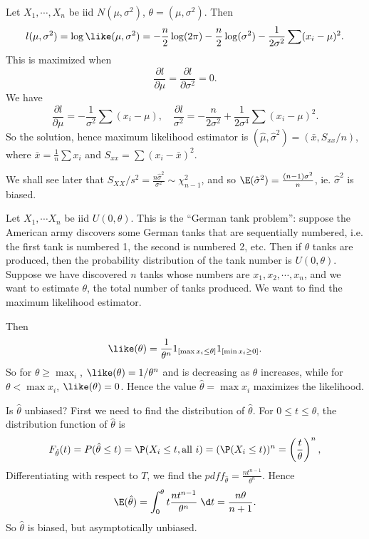 \documentclass[a4paper]{article}
\begin{document}
\begin{eg}
  Let $X_1, \cdots, X_n$ be iid $N(\mu, \sigma^2)$, $\theta = (\mu, \sigma^2)$. Then
  \[
    l(\mu, \sigma^2) = \log\like(\mu, \sigma^2) = -\frac{n}{2}\log (2\pi) - \frac{n}{2}\log (\sigma^2) - \frac{1}{2\sigma^2}\sum (x_i - \mu)^2.
  \]
  This is maximized when
  \[
    \frac{\partial l}{\partial\mu} = \frac{\partial l}{\partial \sigma^2} = 0.
  \]
  We have
  \[
    \frac{\partial l}{\partial \mu} = -\frac{1}{\sigma^2}\sum (x_i - \mu), \quad \frac{\partial l}{\sigma^2} = -\frac{n}{2\sigma^2} + \frac{1}{2\sigma^4}\sum (x_i - \mu)^2.
  \]
  So the solution, hence maximum likelihood estimator is $(\hat{\mu}, \hat{\sigma}^2) = (\bar x, S_{xx}/n)$, where $\bar{x} = \frac{1}{n}\sum x_i$ and $S_{xx} = \sum(x_i - \bar{x})^2$.

  We shall see later that $S_{XX}/s^2 = \frac{n\hat{\sigma}^2}{\sigma^2}\sim \chi_{n - 1}^2$, and so $\E(\hat{\sigma}^2) = \frac{(n - 1)\sigma^2}{n}$, ie. $\hat{\sigma}^2$ is biased.
\end{eg}

\begin{eg}
  Let $X_1, \cdots X_n$ be iid $U(0, \theta)$. This is the ``German tank problem'': suppose the American army discovers some German tanks that are sequentially numbered, i.e. the first tank is numbered 1, the second is numbered 2, etc. Then if $\theta$ tanks are produced, then the probability distribution of the tank number is $U(0, \theta)$. Suppose we have discovered $n$ tanks whose numbers are $x_1, x_2, \cdots, x_n$, and we want to estimate $\theta$, the total number of tanks produced. We want to find the maximum likelihood estimator.

  Then
  \[
    \like(\theta) = \frac{1}{\theta^n}1_{[\max x_i \leq \theta]}1_{[\min x_i\geq 0]}.
  \]
  So for $\theta\geq \max _i$, $\like (\theta) = 1/\theta^n$ and is decreasing as $\theta$ increases, while for $\theta < \max x_i$, $\like (\theta) = 0$. Hence the value $\hat{\theta} = \max x_i$ maximizes the likelihood.

  Is $\hat{\theta}$ unbiased? First we need to find the distribution of $\hat{\theta}$. For $0 \leq t \leq \theta$, the distribution function of $\hat{\theta}$ is
  \[
    F_{\hat{\theta}}(t) = P(\hat{\theta} \leq t) = \P(X_i \leq t, \text{all }i) = (\P(X_i \leq t))^n = \left(\frac{t}{\theta}\right)^n,
  \]
  Differentiating with respect to $T$, we find the $pdf f_{\hat{\theta}} = \frac{nt^{n - 1}}{\theta^n}$. Hence
  \[
    \E(\hat{\theta}) = \int_0^\theta t\frac{nt^{n - 1}}{\theta^n} \;\d t = \frac{n\theta}{n + 1}.
  \]
  So $\hat{\theta}$ is biased, but asymptotically unbiased.
\end{eg}
\end{document}
